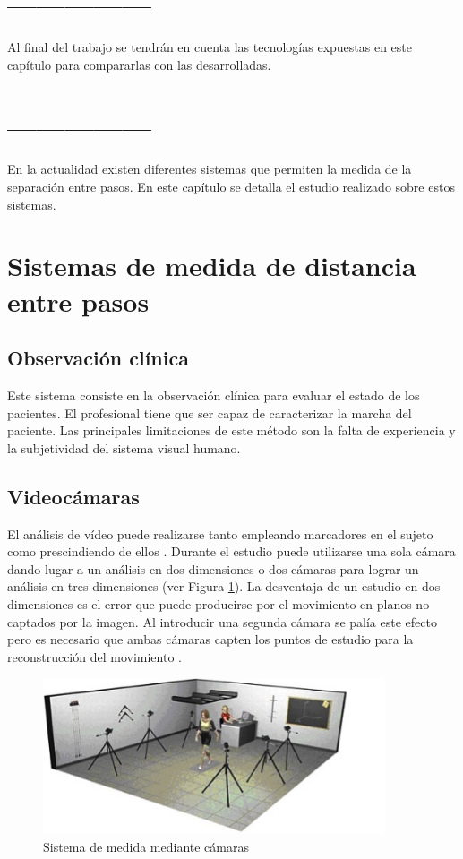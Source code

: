 \section{---------------}

Al final del trabajo se tendrán en cuenta las  tecnologías expuestas en este capítulo para compararlas con las desarrolladas.
\cite{citaPruebaMiri}

\section{---------------}

En la actualidad existen diferentes sistemas que permiten la medida de la separación entre pasos. En este capítulo se detalla el estudio realizado sobre estos sistemas.

\section{Sistemas de medida de distancia entre pasos}
	\subsection{Observación clínica}
	Este sistema consiste en la observación clínica para evaluar el estado de los pacientes. El profesional tiene que ser capaz de caracterizar la marcha del paciente. Las principales limitaciones de este método son la falta de experiencia y la subjetividad del sistema visual humano. 
	
	
	\subsection{Videocámaras}
	El análisis de vídeo puede realizarse tanto empleando marcadores en el sujeto como prescindiendo de ellos \cite{techniques2}. Durante el estudio puede utilizarse una sola cámara dando lugar a un análisis en dos dimensiones o dos cámaras para lograr un análisis en tres dimensiones (ver Figura \ref{fig:camera}). \cite{prueba} La desventaja de un estudio en dos dimensiones es el error que puede producirse por el movimiento en planos no captados por la imagen. Al introducir una segunda cámara se palía este efecto pero es necesario que ambas cámaras capten los puntos de estudio para la reconstrucción del movimiento \cite{techniques}.
	\begin{figure}[H]
		\centering
		\includegraphics[width=0.9\textwidth]{./graphics/camera}
		\caption{Sistema de medida mediante cámaras} \label{fig:camera}
	\end{figure}
	
